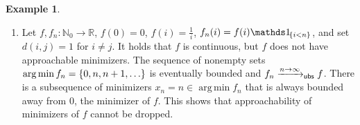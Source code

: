 \documentclass{scrartcl}
\newcommand{\N}{\mathbb{N}}
\newcommand{\R}{\mathbb{R}}
\DeclareMathOperator*{\argmin}{arg\,min}
\theoremstyle{plain}\newtheorem{theorem}{Theorem}[section]
\theoremstyle{definition}
\newtheorem{example}[theorem]{Example}
\theoremstyle{remark}
\begin{document}
\begin{appendix}
\begin{example}
\begin{enumerate}[label=(\roman*)]
	It holds that $f$ is continuous and has approachable minimizers, and $f_n\ubsconv{n}f$, but the sequence of nonempty sets $\argmin f_n = \cb{0,n}$ is not eventually bounded. 
	Again, there is a subsequence of minimizers $x_n=n\in \argmin f_n$ that is always bounded away from $0$, the minimizer of $f$.
	This shows that eventual boundedness of minimizer sets cannot be dropped.
	\item
	Let $f,f_n\colon \N_0 \to \R$, $f(0) = 0$, $f(i) = \frac1i$, $f_n(i) = f(i)\indOfEvent{i < n}$, and set $d(i,j) = 1$  for $i\neq j$.
	It holds that $f$ is continuous, but $f$ does not have approachable minimizers. The sequence of nonempty sets $\argmin f_n = \cb{0,n, n+1, \dots}$ is eventually bounded and $f_n\ubsconv{n}f$.
	There is a subsequence of minimizers $x_n=n\in \argmin f_n$ that is always bounded away from $0$, the minimizer of $f$.
	This shows that approachability of minimizers of $f$ cannot be dropped.
\end{enumerate}
\end{example}

\end{appendix}
\end{document}
